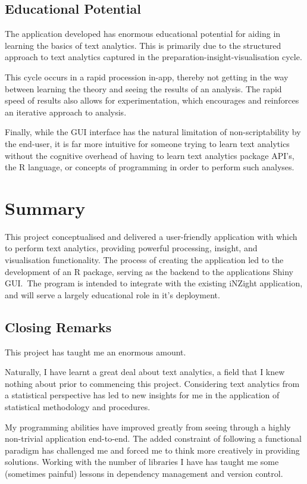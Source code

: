 \message{ !name(jason-cairns-dissertation.tex)}\documentclass[11pt, a4paper, titlepage]{report}
\begin{document}
\subsection{Educational Potential}

The application developed has enormous educational potential for
aiding in learning the basics of text analytics. This is primarily due
to the structured approach to text analytics captured in the
preparation-insight-visualisation cycle.

This cycle occurs in a rapid procession in-app, thereby not getting in
the way between learning the theory and seeing the results of an
analysis. The rapid speed of results also allows for experimentation,
which encourages and reinforces an iterative approach to analysis.

Finally, while the GUI interface has the natural limitation of
non-scriptability by the end-user, it is far more intuitive for
someone trying to learn text analytics without the cognitive overhead
of having to learn text analytics package API's, the R language, or
concepts of programming in order to perform such analyses.

\section{Summary}\label{sec:summary}

This project conceptualised and delivered a user-friendly application
with which to perform text analytics, providing powerful processing,
insight, and visualisation functionality. The process of creating the
application led to the development of an R package, serving as the
backend to the applications Shiny GUI.\ The program is intended to
integrate with the existing iNZight application, and will serve a
largely educational role in it's deployment.

\subsection{Closing Remarks}

This project has taught me an enormous amount.

Naturally, I have learnt a great deal about text analytics, a field
that I knew nothing about prior to commencing this project.
Considering text analytics from a statistical perspective has led to
new insights for me in the application of statistical methodology and
procedures.

My programming abilities have improved greatly from seeing through a
highly non-trivial application end-to-end. The added constraint of
following a functional paradigm has challenged me and forced me to
think more creatively in providing solutions. Working with the number
of libraries I have has taught me some (sometimes painful) lessons in
dependency management and version control.
\end{document}
